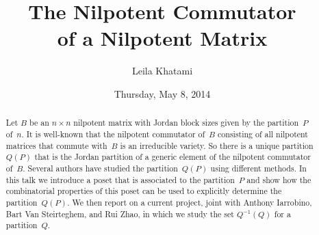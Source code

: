 \documentclass{UAmathtalk}
\author{Leila Khatami}
\title{The Nilpotent Commutator\\ of a Nilpotent Matrix}
\date{Thursday, May 8, 2014}
\begin{document}
\maketitle

\begin{abstract}
Let $B$ be an $n\times n$ nilpotent matrix with Jordan block sizes given by the partition~$P$ of~$n$.
It is well-known that the nilpotent commutator of~$B$ consisting of all nilpotent matrices that commute with~$B$ is an irreducible variety.
So there is a unique partition~$Q(P)$ that is the Jordan partition of a generic element of the nilpotent commutator of~$B$.
Several authors have studied the partition~$Q(P)$ using different methods.
In this talk we introduce a poset that is associated to the partition~$P$ and show how the combinatorial properties of this poset can be used to explicitly determine the partition~$Q(P)$.
We then report on a current project, joint with Anthony Iarrobino, Bart Van Steirteghem, and Rui Zhao, in which we study the set $Q^{−1}(Q)$ for a partition~$Q$.
\end{abstract}
\end{document}

